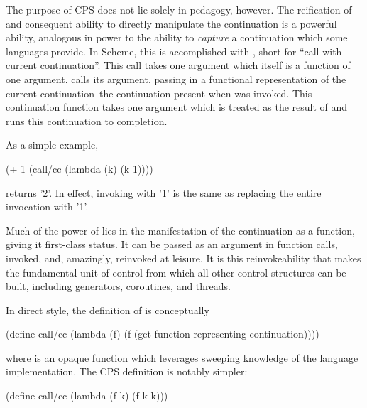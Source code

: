 \documentclass[ms,electronic,twosidetoc,letterpaper,chaptercenter,parttop]{byumsphd}
\begin{document}
The purpose of CPS does not lie solely in pedagogy, however. The reification of and
consequent ability to directly manipulate the continuation is a powerful ability,
analogous in power to the ability to \emph{capture} a continuation which some languages
provide. In Scheme, this is accomplished with , short for ``call with
current continuation''. This call takes one argument which itself is a function of one
argument.  calls its argument, passing in a functional representation of the
current continuation--the continuation present when  was invoked. This
continuation function takes one argument which is treated as the result of 
and runs this continuation to completion.

As a simple example,
\begin{schemedisplay}
(+ 1 (call/cc
       (lambda (k)
         (k 1))))
\end{schemedisplay}
returns \scheme'2'. In effect, invoking  with \scheme'1' is the same 
as replacing the entire  invocation with \scheme'1'.

Much of the power of  lies in the manifestation of the continuation as a
function, giving it first-class status. It can be passed as an argument in function calls,
invoked, and, amazingly, reinvoked at leisure. It is this reinvokeability that makes
 the fundamental unit of control from which all other control structures can
be built, including generators, coroutines, and threads.


In direct style, the definition of  is conceptually 
\begin{schemedisplay}
(define call/cc
  (lambda (f)
    (f (get-function-representing-continuation))))
\end{schemedisplay}
where  is an opaque function which leverages
sweeping knowledge of the language implementation. The CPS definition is notably simpler:
\begin{schemedisplay}
(define call/cc
  (lambda (f k)
    (f k k)))
\end{schemedisplay}
\end{document}
